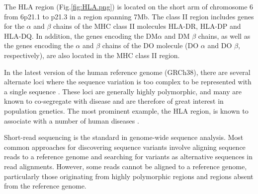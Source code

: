 The HLA region (Fig.\ref{fig:HLA.png}) is located on the short arm of chromosome 6 from 6p21.1 to p21.3 in a region spanning 7Mb. The class II region includes genes for the $\alpha$ and $\beta$ chains of the MHC class II molecules HLA-DR, HLA-DP and HLA-DQ. In addition, the genes encoding the DM$\alpha$ and DM $\beta$ chains, as well as the genes encoding the $\alpha$ and $\beta$ chains of the DO molecule (DO $\alpha$ and DO $\beta$, respectively), are also located in the MHC class II region.





In the latest version of the human reference genome (GRCh38), there are several alternate loci where the sequence variation is too complex to be represented with a single sequence \cite{eggertsson2017graphtyper}. These loci are generally highly polymorphic, and many are known to co-segregate with disease and are therefore of great interest in population genetics. The most prominent example, the HLA region, is known to associate with a number of human diseases . 

Short-read sequencing is the standard in genome-wide sequence analysis. Most common approaches for discovering sequence variants involve aligning sequence reads to a reference genome \cite{li2009fast} and searching for variants as alternative sequences in read alignments. However, some reads cannot be aligned to a reference genome, particularly those originating from highly polymorphic regions and regions absent from the reference genome.